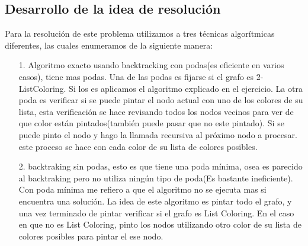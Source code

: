 \subsection{Desarrollo de la idea de resolución}
\vspace*{0.3cm}
Para la resolución de este problema utilizamos a tres técnicas algorítmicas diferentes, las cuales enumeramos de la siguiente manera:
 \begin{itemize}
	\item[1.] Algoritmo exacto usando backtracking con podas(es eficiente en varios casos), tiene mas podas.
	Una de las podas es fijarse si el grafo es 2-ListColoring. Si los es aplicamos el algoritmo explicado en el ejercicio. \newline
	La otra poda es verificar si se puede pintar el nodo actual con uno de los colores de su lista, esta verificación se hace revisando todos los nodos vecinos para ver de que color están pintados(también puede pasar que no este pintado). Si se puede pinto el nodo y hago la llamada recursiva al próximo nodo a procesar. este proceso se hace con cada color de su lista de colores posibles.
	\item[2.] backtraking sin podas, esto es que tiene una poda mínima, osea es parecido al backtraking pero no utiliza ningún tipo de poda(Es bastante ineficiente). Con poda mínima me refiero a que el algoritmo no se ejecuta mas si encuentra una solución.
	La idea de este algoritmo es pintar todo el grafo, y una vez terminado de pintar verificar si el grafo es List Coloring. En el caso en que no es List Coloring, pinto los nodos utilizando otro color de su lista de colores posibles para pintar el ese nodo. 
	 

\end{itemize}
